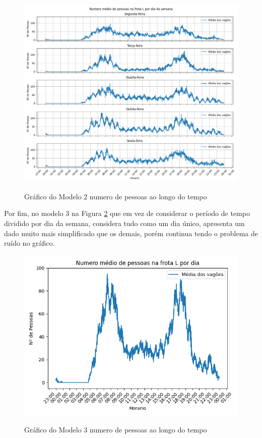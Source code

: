 \documentclass[acronym,symbols,table]{fei}
\begin{document}
\begin{figure}[!htb]
    \centering
	\caption{Gráfico do Modelo 2 numero de pessoas ao longo do tempo}
    \includegraphics[width=0.75\linewidth]{Imagens/Modelo_2-Numero_medio_de_pessoas_na_frota_L_por_dia_da_semana.png}
    \label{fig:modelo2}
\end{figure}

Por fim, no modelo 3 na Figura \ref{fig:modelo3} que em vez de considerar o período de tempo dividido por dia da semana, considera tudo como um dia único, apresenta um dado muito mais simplificado que os demais, porém continua tendo o problema de ruído no gráfico.

\begin{figure}[!htb]
    \centering
	\caption{Gráfico do Modelo 3 numero de pessoas ao longo do tempo}
    \includegraphics[width=0.7\linewidth]{Imagens/Modelo_3-Numero_medio_de_pessoas_na_frota_L_por_dia.png}
    \label{fig:modelo3}
\end{figure}

\newpage 
\end{document}
